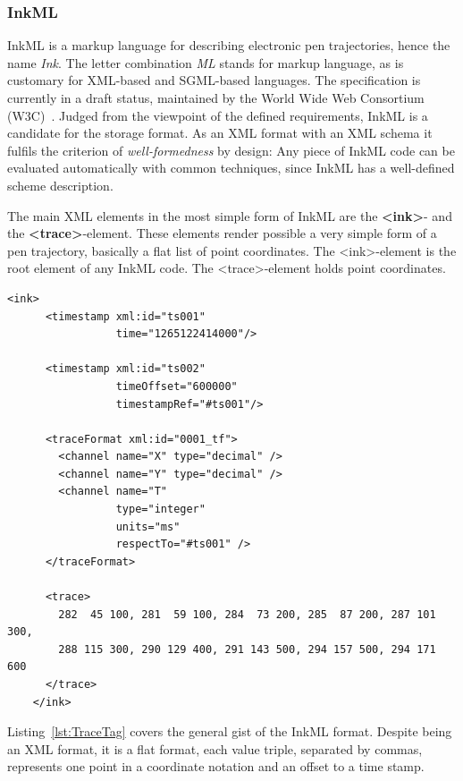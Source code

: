 \subsubsection{InkML}
\label{sec:hwre:inkml}

InkML is a markup language for describing electronic pen trajectories,
hence the name \emph{Ink}. The letter combination \emph{ML} stands for markup 
language, as is customary 
for XML-based and SGML-based languages. The specification is currently in a 
draft status, maintained by the World Wide Web Consortium 
(W3C)~.
Judged from the viewpoint of the defined requirements, InkML is a candidate
for the storage format. As an XML format with an XML schema it fulfils the 
criterion of \emph{well-formedness} by design: 
Any piece of InkML code can be evaluated automatically with common techniques, 
since InkML has a well-defined scheme description.

The main XML elements in the most simple form of InkML are 
the \textbf{<ink>}- and the \textbf{<trace>}-element.
These elements render possible a very simple form of a pen trajectory, 
basically a flat list of point coordinates.
The <ink>-element is the root element of any InkML code. 
The <trace>-element holds point coordinates.
\begin{xmlcode}
  \begin{lstlisting}[emph={trace,timestamp,channel},
                     emphstyle=\color{blue}\textbf,
                     emph={[2]name,type,units,respectTo,time,
                              timeOffset,timestampRef},
                     caption={Demonstration of the \emph{time channel} and the \emph{trace} tag},
                     label=lst:TraceTag]
    <ink>
      <timestamp xml:id="ts001" 
                 time="1265122414000"/>

      <timestamp xml:id="ts002" 
                 timeOffset="600000" 
                 timestampRef="#ts001"/>

      <traceFormat xml:id="0001_tf">
        <channel name="X" type="decimal" />
        <channel name="Y" type="decimal" />
        <channel name="T" 
                 type="integer" 
                 units="ms" 
                 respectTo="#ts001" />
      </traceFormat>

      <trace>
        282  45 100, 281  59 100, 284  73 200, 285  87 200, 287 101 300, 
        288 115 300, 290 129 400, 291 143 500, 294 157 500, 294 171 600
      </trace>
    </ink>
  \end{lstlisting}
\end{xmlcode}
Listing~\ref{lst:TraceTag} covers the general gist of the InkML format.
Despite being an XML format, it is a flat format, each value triple, 
separated by commas, represents one point in a coordinate notation and
an offset to a time stamp.

